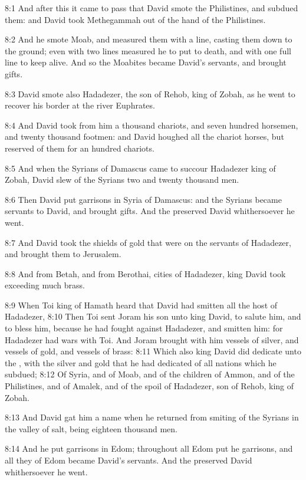 8:1 And after this it came to pass that David smote the Philistines,
and subdued them: and David took Methegammah out of the hand of the
Philistines.

8:2 And he smote Moab, and measured them with a line, casting them
down to the ground; even with two lines measured he to put to death,
and with one full line to keep alive. And so the Moabites became
David's servants, and brought gifts.

8:3 David smote also Hadadezer, the son of Rehob, king of Zobah, as he
went to recover his border at the river Euphrates.

8:4 And David took from him a thousand chariots, and seven hundred
horsemen, and twenty thousand footmen: and David houghed all the
chariot horses, but reserved of them for an hundred chariots.

8:5 And when the Syrians of Damascus came to succour Hadadezer king of
Zobah, David slew of the Syrians two and twenty thousand men.

8:6 Then David put garrisons in Syria of Damascus: and the Syrians
became servants to David, and brought gifts. And the \LORD preserved
David whithersoever he went.

8:7 And David took the shields of gold that were on the servants of
Hadadezer, and brought them to Jerusalem.

8:8 And from Betah, and from Berothai, cities of Hadadezer, king David
took exceeding much brass.

8:9 When Toi king of Hamath heard that David had smitten all the host
of Hadadezer, 8:10 Then Toi sent Joram his son unto king David, to
salute him, and to bless him, because he had fought against Hadadezer,
and smitten him: for Hadadezer had wars with Toi. And Joram brought
with him vessels of silver, and vessels of gold, and vessels of brass:
8:11 Which also king David did dedicate unto the \LORD, with the silver
and gold that he had dedicated of all nations which he subdued; 8:12
Of Syria, and of Moab, and of the children of Ammon, and of the
Philistines, and of Amalek, and of the spoil of Hadadezer, son of
Rehob, king of Zobah.

8:13 And David gat him a name when he returned from smiting of the
Syrians in the valley of salt, being eighteen thousand men.

8:14 And he put garrisons in Edom; throughout all Edom put he
garrisons, and all they of Edom became David's servants. And the \LORD
preserved David whithersoever he went.

